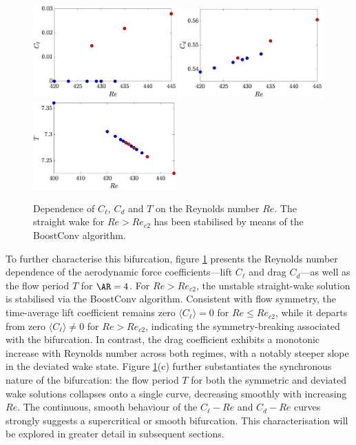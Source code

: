 \begin{figure}
  \centering
  \includegraphics[width=0.49\textwidth]{./fig/AR4_Cl_Re.eps}
  \includegraphics[width=0.49\textwidth]{./fig/AR4_Cd_Re.eps}
  \includegraphics[width=0.49\textwidth]{./fig/AR4_T_Re.eps}
  \caption{Dependence of $C_\ell$, $C_d$ and $T$ on the Reynolds number $Re$. The straight wake for $Re>Re_{c2}$ has been stabilised by means of the BoostConv algorithm.}
  \label{fig:Cl-Cd-AR4}
\end{figure}
%
To further characterise this bifurcation, figure \ref{fig:Cl-Cd-AR4} presents the Reynolds number dependence of the aerodynamic force coefficients---lift $C_\ell$ and drag $C_d$---as well as the flow period $T$ for $\AR=4$. For $Re>Re_{c2}$, the unstable straight-wake solution is stabilised via the BoostConv algorithm. Consistent with flow symmetry, the time-average lift coefficient remains zero $\langle C_\ell \rangle = 0$ for $Re \le Re_{c2}$, while it departs from zero $\langle C_\ell \rangle \neq 0$ for $Re>Re_{c2}$, indicating the symmetry-breaking associated with the bifurcation. In contrast, the drag coefficient exhibits a monotonic increase with Reynolds number across both regimes, with a notably steeper slope in the deviated wake state. Figure \ref{fig:Cl-Cd-AR4}(c) further substantiates the synchronous nature of the bifurcation: the flow period $T$ for both the symmetric and deviated wake solutions collapses onto a single curve, decreasing smoothly with increasing $Re$. The continuous, smooth behaviour of the $C_\ell-Re$ and $C_d-Re$ curves strongly suggests a supercritical or smooth bifurcation. This characterisation will be explored in greater detail in subsequent sections.

